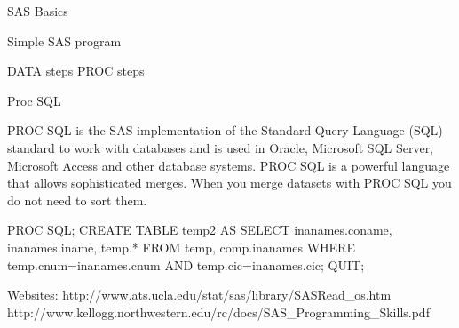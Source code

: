 SAS Basics 

Simple SAS program

DATA steps
PROC steps

Proc SQL

PROC SQL is the SAS implementation of the Standard Query Language (SQL) standard to
work with databases and is used in Oracle, Microsoft SQL Server, Microsoft Access and other
database systems. PROC SQL is a powerful language that allows sophisticated merges. 
When you merge datasets with PROC SQL you do not need to sort them.

PROC SQL;
CREATE TABLE temp2 AS SELECT
inanames.coname, inanames.iname, temp.*
FROM temp, comp.inanames
WHERE temp.cnum=inanames.cnum AND temp.cic=inanames.cic;
QUIT;


Websites:
http://www.ats.ucla.edu/stat/sas/library/SASRead_os.htm
http://www.kellogg.northwestern.edu/rc/docs/SAS_Programming_Skills.pdf

